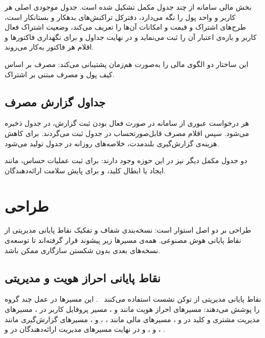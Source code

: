 بخش مالی سامانه از چند جدول مکمل تشکیل شده است. جدول  موجودی
اصلی هر کاربر و واحد پول را نگه می‌دارد،  دفترکل
تراکنش‌های بدهکار و بستانکار است،  طرح‌های اشتراک
و قیمت و امکانات آن‌ها را تعریف می‌کند،  وضعیت اشتراک
فعال کاربر و بازه‌ی اعتبار آن را ثبت می‌نماید و در نهایت جداول
 و  برای نگهداری فاکتورها و اقلام هر
فاکتور به‌کار می‌روند.

این ساختار دو الگوی مالی را به‌صورت هم‌زمان پشتیبانی می‌کند: مصرف بر اساس
کیف پول و مصرف مبتنی بر اشتراک.

\subsection{جداول گزارش مصرف}

هر درخواست عبوری از سامانه در صورت فعال بودن ثبت گزارش، در جدول
 ذخیره می‌شود. سپس اقلام مصرف قابل‌صورتحساب در جدول
 ثبت می‌گردند. برای کاهش هزینه‌ی گزارش‌گیری بلندمدت،
خلاصه‌های روزانه در جدول  تولید می‌شود.

دو جدول مکمل دیگر نیز در این حوزه وجود دارند:  برای ثبت
عملیات حساس، مانند ایجاد یا ابطال کلید، و 
برای پایش سلامت ارائه‌دهندگان.

\section{طراحی }

طراحی  بر دو اصل استوار است: نسخه‌بندی شفاف و تفکیک نقاط پایانی
مدیریتی از نقاط پایانی هوش مصنوعی. همه‌ی مسیرها زیر پیشوند 
قرار گرفته‌اند تا توسعه‌ی نسخه‌های بعدی بدون شکستن سازگاری ممکن باشد.

\subsection{نقاط پایانی احراز هویت و مدیریتی}

نقاط پایانی مدیریتی از توکن نشست  استفاده می‌کنند
~\cite{sanctum2024}. این مسیرها در عمل چند گروه را پوشش می‌دهند: مسیرهای
احراز هویت مانند  و ، مسیر
پروفایل کاربر در ، مسیرهای مدیریت مشتری و کلید در
 و ، مسیرهای مالی مانند
، ،  و ،
مسیرهای گزارش‌گیری مانند ،
 و ، و در نهایت مسیرهای
مدیریت ارائه‌دهندگان در  و
.

